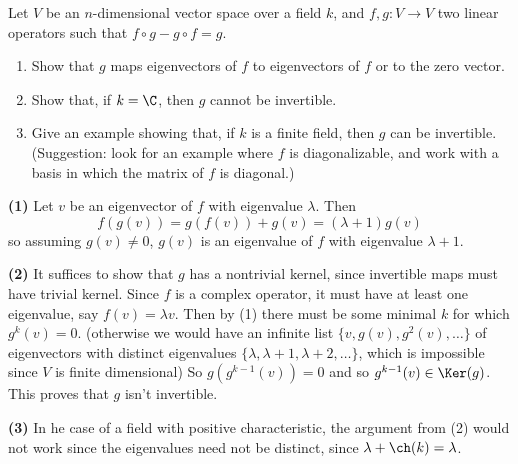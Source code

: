 \begin{problem}
Let $V$ be an $n$-dimensional vector space over a field $k$, and $f,g:V\to V$ two linear operators such that $f\circ g-g\circ f=g$.
\begin{enumerate}
  \item Show that $g$ maps eigenvectors of $f$ to eigenvectors of $f$
  or to the zero vector.
  \item Show that, if $k=\C$, then $g$ cannot be invertible.
  \item Give an example showing that, if $k$ is a finite field, then $g$ can be invertible. (Suggestion: look for an example where $f$ is diagonalizable, and work with a basis in which the matrix of $f$ is diagonal.)
\end{enumerate}
\end{problem}

\textbf{(1)} Let $v$ be an eigenvector of $f$ with eigenvalue $\lambda$. Then
\[
  f(g(v)) = g(f(v))+g(v) = (\lambda+1)g(v)
\] 
so assuming $g(v)\neq 0$, $g(v)$ is an eigenvalue of $f$ with eigenvalue $\lambda+1$.

\textbf{(2)} It suffices to show that $g$ has a nontrivial kernel, since invertible maps must have trivial kernel. Since $f$ is a complex operator, it must have at least one eigenvalue, say $f(v)=\lambda v$. Then by (1) there must be some minimal $k$ for which $g^k(v)=0$. (otherwise we would have an infinite list $\{v, g(v), g^2(v),\ldots\}$ of eigenvectors with distinct eigenvalues $\{\lambda, \lambda+1, \lambda+2,\ldots\}$, which is impossible since $V$ is finite dimensional)  So $g(g^{k-1}(v))=0$ and so $g^{k-1}(v)\in \Ker(g)$. This proves that $g$ isn't invertible. 

\textbf{(3)} In he case of a field with positive characteristic, the argument from (2) would not work since the eigenvalues need not be distinct, since $\lambda+\ch(k)=\lambda$. 

